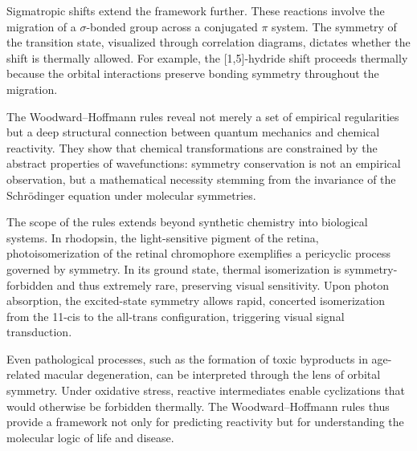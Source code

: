 Sigmatropic shifts extend the framework further. These reactions involve the migration of a $\sigma$-bonded group across a conjugated $\pi$ system. The symmetry of the transition state, visualized through correlation diagrams, dictates whether the shift is thermally allowed. For example, the [1,5]-hydride shift proceeds thermally because the orbital interactions preserve bonding symmetry throughout the migration.

The Woodward–Hoffmann rules reveal not merely a set of empirical regularities but a deep structural connection between quantum mechanics and chemical reactivity. They show that chemical transformations are constrained by the abstract properties of wavefunctions: symmetry conservation is not an empirical observation, but a mathematical necessity stemming from the invariance of the Schrödinger equation under molecular symmetries.

The scope of the rules extends beyond synthetic chemistry into biological systems. In rhodopsin, the light-sensitive pigment of the retina, photoisomerization of the retinal chromophore exemplifies a pericyclic process governed by symmetry. In its ground state, thermal isomerization is symmetry-forbidden and thus extremely rare, preserving visual sensitivity. Upon photon absorption, the excited-state symmetry allows rapid, concerted isomerization from the 11-cis to the all-trans configuration, triggering visual signal transduction.

Even pathological processes, such as the formation of toxic byproducts in age-related macular degeneration, can be interpreted through the lens of orbital symmetry. Under oxidative stress, reactive intermediates enable cyclizations that would otherwise be forbidden thermally. The Woodward–Hoffmann rules thus provide a framework not only for predicting reactivity but for understanding the molecular logic of life and disease.

